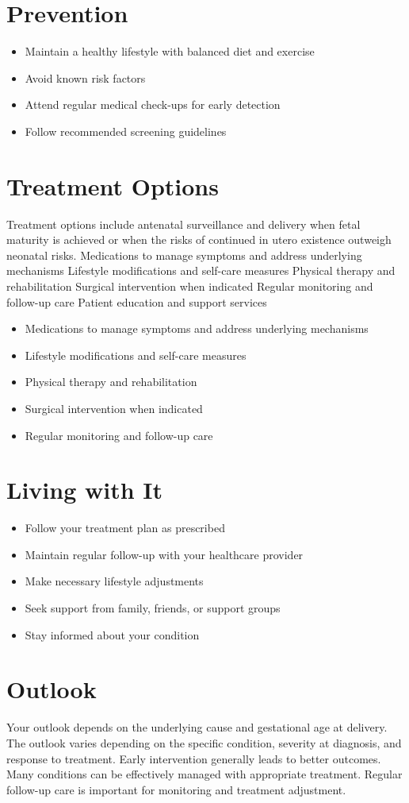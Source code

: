 \section{Prevention}
\begin{itemize}[noitemsep]
  \item Maintain a healthy lifestyle with balanced diet and exercise
  \item Avoid known risk factors
  \item Attend regular medical check-ups for early detection
  \item Follow recommended screening guidelines
\end{itemize}
\section{Treatment Options}
Treatment options include antenatal surveillance and delivery when fetal maturity is achieved or when the risks of continued in utero existence outweigh neonatal risks. Medications to manage symptoms and address underlying mechanisms Lifestyle modifications and self-care measures Physical therapy and rehabilitation Surgical intervention when indicated Regular monitoring and follow-up care Patient education and support services

\begin{itemize}[noitemsep]
  \item Medications to manage symptoms and address underlying mechanisms
  \item Lifestyle modifications and self-care measures
  \item Physical therapy and rehabilitation
  \item Surgical intervention when indicated
  \item Regular monitoring and follow-up care
\end{itemize}
\section{Living with It}
\begin{itemize}[noitemsep]
  \item Follow your treatment plan as prescribed
  \item Maintain regular follow-up with your healthcare provider
  \item Make necessary lifestyle adjustments
  \item Seek support from family, friends, or support groups
  \item Stay informed about your condition
\end{itemize}
\section{Outlook}
Your outlook depends on the underlying cause and gestational age at delivery. The outlook varies depending on the specific condition, severity at diagnosis, and response to treatment. Early intervention generally leads to better outcomes. Many conditions can be effectively managed with appropriate treatment. Regular follow-up care is important for monitoring and treatment adjustment.
